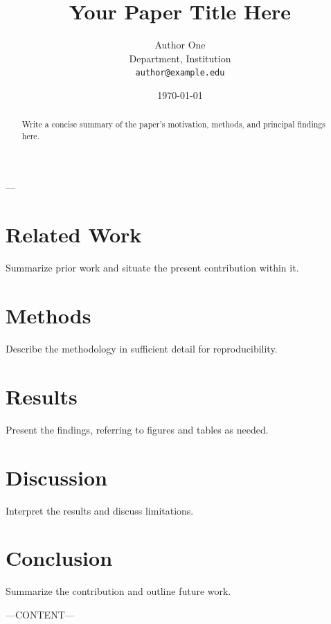 ---
\usepackage[margin=1in]{geometry}
\usepackage[language=english]{lipsum}
\usepackage{amsmath}
\usepackage{amssymb}
\usepackage{graphicx}
\usepackage{lipsum}

\title{Your Paper Title Here}
\author{Author One \\ Department, Institution \\ \texttt{author@example.edu}}
\date{\today}



\maketitle

\begin{abstract}
Write a concise summary of the paper's motivation, methods, and
principal findings here.
\end{abstract}



\section{Related Work}
Summarize prior work and situate the present contribution within it.
\lipsum[1]

\section{Methods}
Describe the methodology in sufficient detail for reproducibility.
\lipsum[1-4]

\section{Results}
Present the findings, referring to figures and tables as needed.

\section{Discussion}
Interpret the results and discuss limitations.

\section{Conclusion}
Summarize the contribution and outline future work.

% 
% 


---CONTENT---